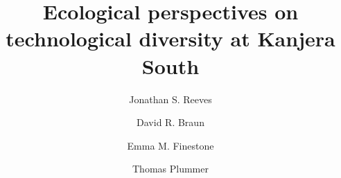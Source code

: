 \documentclass[]{elsarticle} %
\begin{document}
\begin{frontmatter}

  \title{Ecological perspectives on technological diversity at Kanjera South}
    \author[Department of Prehistory and Quarternary Ecology, Eberhard Karls
University of Tübingen]{Jonathan S. Reeves}
    \author[Center for the Advanced Study of Human Paleobiology, The George
Washington University]{David R. Braun}
    \author[Department of Archaeology, Max Planck Institute for the Science of Human
History]{Emma M. Finestone}
    \author[The Graduate Center, City University of New York]{Thomas Plummer}
      \address[Department of Prehistory and Quarternary Ecology]{Eberhard Karls University of Tübingen, Schloss Hohentübingen Burgsteige
11, 72070 Tübingen, Germany}
    \address[Center for the Advanced Study of Human Paleobiology]{George Washington University, 800 22nd Street, North West, Washington
D.C., USA.}
    \address[Department of Archaeology]{Max Planck Institute for the Science of Human History, Kahlaische
Strasse 10, D-07743, Jena, Germany}
    \address[Department of Anthropology, Queens College]{CUNY \& NYCEP, 65-30 Kissena Blvd, Flushing, NY 11367, USA}
  

\end{frontmatter}
\end{document}
